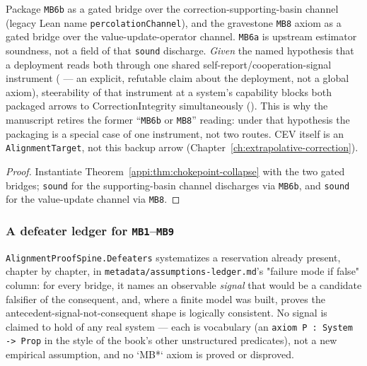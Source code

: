 \begin{corollary}
\label{appi:cor:chokepoint-mb6-mb8}
Package \texttt{MB6b} as a gated bridge over the correction-supporting-basin channel (legacy Lean name \texttt{percolationChannel}), and the gravestone \texttt{MB8} axiom as a gated bridge over the value-update-operator channel. \texttt{MB6a} is upstream estimator soundness, not a field of that \texttt{sound} discharge. \emph{Given} the named hypothesis that a deployment reads both through one shared self-report/cooperation-signal instrument ( --- an explicit, refutable claim about the deployment, not a global axiom), steerability of that instrument at a system's capability blocks both packaged arrows to \(\mathrm{CorrectionIntegrity}\) simultaneously (). This is why the manuscript retires the former ``\texttt{MB6b} or \texttt{MB8}'' reading: under that hypothesis the packaging is a special case of one instrument, not two routes. CEV itself is an \texttt{AlignmentTarget}, not this backup arrow (Chapter~\ref{ch:extrapolative-correction}).
\end{corollary}
\begin{proof}
Instantiate Theorem~\ref{appi:thm:chokepoint-collapse} with the two gated bridges; \texttt{sound} for the supporting-basin channel discharges via \texttt{MB6b}, and \texttt{sound} for the value-update channel via \texttt{MB8}.
\end{proof}

\subsubsection{A defeater ledger for \texttt{MB1}--\texttt{MB9}}
\label{appi:sec:defeaters}

\texttt{AlignmentProofSpine.Defeaters} systematizes a reservation already present, chapter by chapter, in \texttt{metadata/assumptions-ledger.md}'s "failure mode if false" column: for every bridge, it names an observable \emph{signal} that would be a candidate falsifier of the consequent, and, where a finite model was built, proves the antecedent-signal-not-consequent shape is logically consistent. No signal is claimed to hold of any real system --- each is vocabulary (an \texttt{axiom P : System -> Prop} in the style of the book's other unstructured predicates), not a new empirical assumption, and no `MB*` axiom is proved or disproved.

